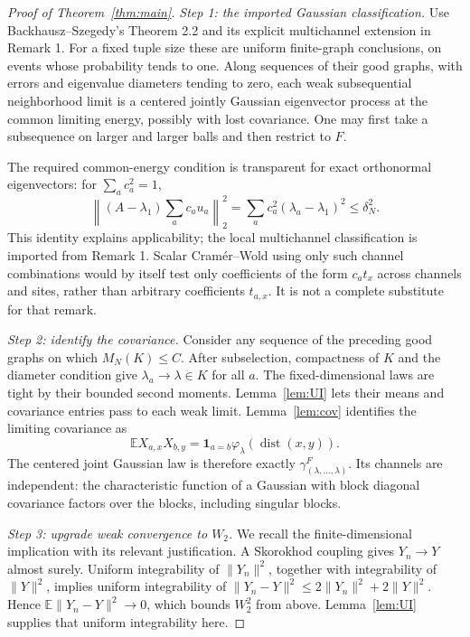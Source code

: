 \documentclass[11pt]{article}
\numberwithin{equation}{section}
\theoremstyle{definition}
\theoremstyle{remark}
\newcommand{\E}{\mathbb E}
\newcommand{\one}{\mathbf 1}
\newcommand{\BS}{Backhausz--Szegedy}
\begin{document}
\begin{proof}[Proof of Theorem~\ref{thm:main}]
\emph{Step 1: the imported Gaussian classification.}
Use \BS's Theorem 2.2 and its explicit multichannel extension in Remark 1.
For a fixed tuple size these are uniform finite-graph conclusions, on
events whose probability tends to one. Along sequences of their good
graphs, with errors and eigenvalue diameters tending to zero, each weak
subsequential neighborhood limit is a centered jointly Gaussian
eigenvector process at the common limiting energy, possibly with lost
covariance. One may first take a subsequence on larger and larger
balls and then restrict to $F$.

The required common-energy condition is transparent for exact
orthonormal eigenvectors: for $\sum_a c_a^2=1$,
\begin{equation}\label{eq:combination}
 \left\|(A-\lambda_1)\sum_a c_a u_a\right\|_2^2
 =\sum_a c_a^2(\lambda_a-\lambda_1)^2\leq\delta_N^2.
\end{equation}
This identity explains applicability; the local multichannel
classification is imported from Remark 1. Scalar Cram\'er--Wold using
only such channel combinations would by itself test only coefficients
of the form $c_a t_x$ across channels and sites, rather than arbitrary
coefficients $t_{a,x}$. It is not a complete substitute for that remark.

\emph{Step 2: identify the covariance.}
Consider any sequence of the preceding good graphs on which
$M_N(K)\leq C$. After subselection, compactness of $K$ and the diameter
condition give $\lambda_a\to\lambda\in K$ for all $a$.
The fixed-dimensional laws are tight by their bounded second moments.
Lemma~\ref{lem:UI} lets their means and covariance entries pass to
each weak limit. Lemma~\ref{lem:cov} identifies the limiting covariance as
\[
 \E X_{a,x}X_{b,y}
 =\one_{a=b}\varphi_\lambda(\operatorname{dist}(x,y)).
\]
The centered joint Gaussian law is therefore exactly
$\gamma^F_{(\lambda,\ldots,\lambda)}$. Its channels are independent:
the characteristic function of a Gaussian with block diagonal
covariance factors over the blocks, including singular blocks.

\emph{Step 3: upgrade weak convergence to $W_2$.}
We recall the finite-dimensional implication with its relevant
justification. A Skorokhod coupling gives $Y_n\to Y$ almost surely.
Uniform integrability of $\|Y_n\|^2$, together with integrability of
$\|Y\|^2$, implies uniform integrability of
$\|Y_n-Y\|^2\leq2\|Y_n\|^2+2\|Y\|^2$. Hence
$\E\|Y_n-Y\|^2\to0$, which bounds $W_2^2$ from above.
Lemma~\ref{lem:UI} supplies that uniform integrability here.


\end{proof}
\end{document}
